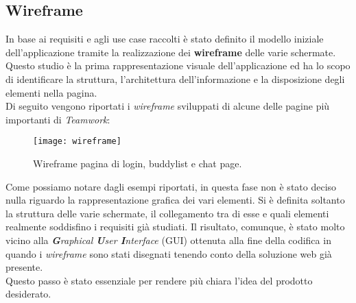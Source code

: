 \subsection{Wireframe}
In base ai requisiti e agli use case raccolti è stato definito il modello iniziale
 dell'applicazione tramite la realizzazione dei \textbf{wireframe} delle varie schermate. \\
Questo studio è la prima rappresentazione visuale dell'applicazione ed ha lo 
scopo di identificare la struttura, l'architettura dell'informazione e la 
disposizione degli elementi nella pagina.\\
Di seguito vengono riportati i \emph{wireframe} sviluppati di alcune delle pagine più 
importanti di \emph{Teamwork}:
\begin{figure}[H] 
	\centering
	\texttt{[image: wireframe]}
	\caption{Wireframe pagina di login, buddylist e chat page.}
	\label{subsec:wireframe}
\end{figure}
Come possiamo notare dagli esempi riportati, in questa fase non è stato deciso 
nulla riguardo la rappresentazione grafica dei vari elementi. 
Si è definita soltanto la struttura delle varie schermate, il collegamento tra 
di esse e quali elementi realmente soddisfino i requisiti già studiati. 
Il risultato, comunque, è stato molto vicino alla \emph{\textbf{G}raphical \textbf{U}ser \textbf{I}nterface} (\acrshort{GUI}) ottenuta alla fine della 
codifica in quando i \emph{wireframe} sono stati disegnati tenendo conto della 
soluzione web già presente.\\ 
Questo passo è stato essenziale per rendere più chiara l'idea del prodotto desiderato.

